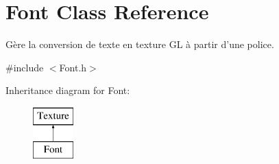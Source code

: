 \hypertarget{classFont}{\section{Font Class Reference}
\label{classFont}
}


Gère la conversion de texte en texture G\-L à partir d'une police.  




{\ttfamily \#include $<$Font.\-h$>$}

Inheritance diagram for Font\-:\begin{figure}[H]
\begin{center}
\leavevmode
\includegraphics[height=2.000000cm]{classFont}
\end{center}
\end{figure}
